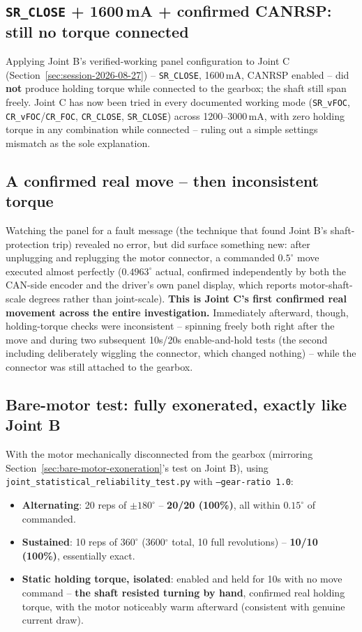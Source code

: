 \documentclass[11pt,letterpaper]{article}
\begin{document}
\subsection{\texttt{SR\_CLOSE} + 1600\,mA + confirmed CANRSP: still no torque connected}
Applying Joint B's verified-working panel configuration to Joint C (Section~\ref{sec:session-2026-08-27}) -- \texttt{SR\_CLOSE}, 1600\,mA, CANRSP enabled -- did \textbf{not} produce holding torque while connected to the gearbox; the shaft still span freely. Joint C has now been tried in every documented working mode (\texttt{SR\_vFOC}, \texttt{CR\_vFOC}/\texttt{CR\_FOC}, \texttt{CR\_CLOSE}, \texttt{SR\_CLOSE}) across 1200--3000\,mA, with zero holding torque in any combination while connected -- ruling out a simple settings mismatch as the sole explanation.

\subsection{A confirmed real move -- then inconsistent torque}
Watching the panel for a fault message (the technique that found Joint B's shaft-protection trip) revealed no error, but did surface something new: after unplugging and replugging the motor connector, a commanded $0.5^\circ$ move executed almost perfectly ($0.4963^\circ$ actual, confirmed independently by both the CAN-side encoder and the driver's own panel display, which reports motor-shaft-scale degrees rather than joint-scale). \textbf{This is Joint C's first confirmed real movement across the entire investigation.} Immediately afterward, though, holding-torque checks were inconsistent -- spinning freely both right after the move and during two subsequent 10s/20s enable-and-hold tests (the second including deliberately wiggling the connector, which changed nothing) -- while the connector was still attached to the gearbox.

\subsection{Bare-motor test: fully exonerated, exactly like Joint B}
With the motor mechanically disconnected from the gearbox (mirroring Section~\ref{sec:bare-motor-exoneration}'s test on Joint B), using \texttt{joint\_statistical\_reliability\_test.py} with \texttt{--gear-ratio 1.0}:
\begin{itemize}
    \item \textbf{Alternating}: 20 reps of $\pm180^\circ$ -- \textbf{20/20 (100\%)}, all within $0.15^\circ$ of commanded.
    \item \textbf{Sustained}: 10 reps of $360^\circ$ (3600$^\circ$ total, 10 full revolutions) -- \textbf{10/10 (100\%)}, essentially exact.
    \item \textbf{Static holding torque, isolated}: enabled and held for 10s with no move command -- \textbf{the shaft resisted turning by hand}, confirmed real holding torque, with the motor noticeably warm afterward (consistent with genuine current draw).
\end{itemize}
\end{document}

